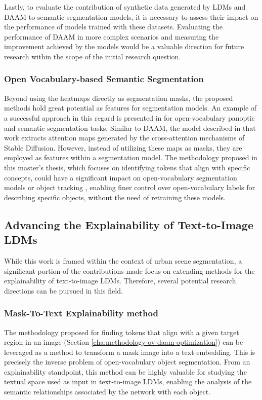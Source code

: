 Lastly, to evaluate the contribution of synthetic data generated by LDMs and DAAM to semantic segmentation models, it is necessary to assess their impact on the performance of models trained with these datasets. Evaluating the performance of DAAM in more complex scenarios and measuring the improvement achieved by the models would be a valuable direction for future research within the scope of the initial research question.

\subsubsection{Open Vocabulary-based Semantic Segmentation}
\label{sec:future-ov-segmentation}

Beyond using the heatmaps directly as segmentation masks, the proposed methods hold great potential as features for segmentation models. An example of a successful approach in this regard is presented in \cite{xu2022odise} for open-vocabulary panoptic and semantic segmentation tasks. Similar to DAAM, the model described in that work extracts attention maps generated by the cross-attention mechanisms of Stable Diffusion. However, instead of utilizing these maps as masks, they are employed as features within a segmentation model. The methodology proposed in this master's thesis, which focuses on identifying tokens that align with specific concepts, could have a significant impact on open-vocabulary segmentation models \cite{xu2022odise} or object tracking \cite{ovtrack}, enabling finer control over open-vocabulary labels for describing specific objects, without the need of retraining these models.


\subsection{Advancing the Explainability of Text-to-Image LDMs}
\label{sec:future-explainability}

While this work is framed within the context of urban scene segmentation, a significant portion of the contributions made focus on extending methods for the explainability of text-to-image LDMs. Therefore, several potential research directions can be pursued in this field.

\subsubsection{Mask-To-Text Explainability method}

The methodology proposed for finding tokens that align with a given target region in an image (Section \ref{cha:methodology-ov-daam-optimization}) can be leveraged as a method to transform a mask image into a text embedding. This is precisely the inverse problem of open-vocabulary object segmentation. From an explainability standpoint, this method can be highly valuable for studying the textual space used as input in text-to-image LDMs, enabling the analysis of the semantic relationships associated by the network with each object. 

